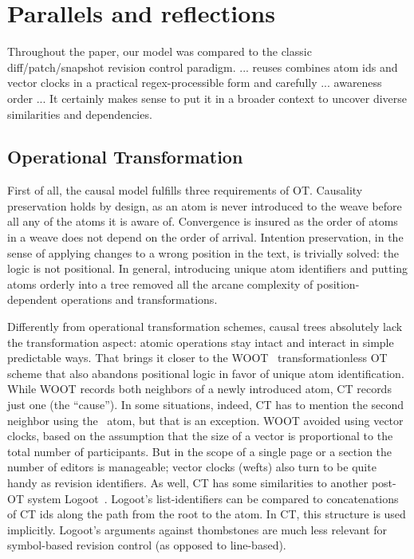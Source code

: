\documentclass{acm_proc_article-sp}
\begin{document}
\section{Parallels and reflections} \label{sec:reflections}

Throughout the paper, our model was compared to the classic
diff/patch/snapshot revision control paradigm. 
...
reuses
combines atom ids and vector clocks in a practical regex-processible form and  carefully ... awareness order
...
It certainly makes
sense to put it in a broader context to uncover diverse
similarities and dependencies.

\subsection{Operational Transformation} \label{sec:ot}

First of all, the causal model fulfills three requirements of OT.
Causality preservation holds
by design, as an atom is never introduced to the weave before all
any of the atoms it is aware of.
Convergence is insured as the order of atoms in a weave does
not depend on the order of arrival. Intention
preservation, in the sense of applying changes to a wrong position
in the text, is trivially solved: the logic is not positional.
In general, introducing unique atom identifiers and putting
atoms orderly into a tree removed all the arcane complexity
of position-dependent operations and transformations.

Differently from operational transformation schemes, causal trees
absolutely lack the transformation aspect: atomic operations
stay intact and interact in simple predictable ways. That brings
it closer to the WOOT~\cite{woot} transformationless OT scheme
that also abandons positional logic in favor of unique atom
identification. While WOOT records both neighbors of a newly
introduced atom, CT records just one (the ``cause''). 
In some situations, indeed, CT has to mention the second
neighbor using the \zero ~atom, but that is an exception.
WOOT avoided using vector clocks, based on the assumption that
the size of a vector is proportional to the total number of
participants. But in the scope of a single page or a
section the number of editors is manageable; vector clocks
(wefts) also turn to be quite handy as revision identifiers.
As well, CT has some similarities to another post-OT system
Logoot~\cite{logoot}. Logoot's list-identifiers can be compared
to concatenations of CT ids along the path from the root to 
the atom. In CT, this structure is used implicitly.
Logoot's arguments against thombstones are much less relevant
for symbol-based revision control (as opposed to line-based).
\end{document}
